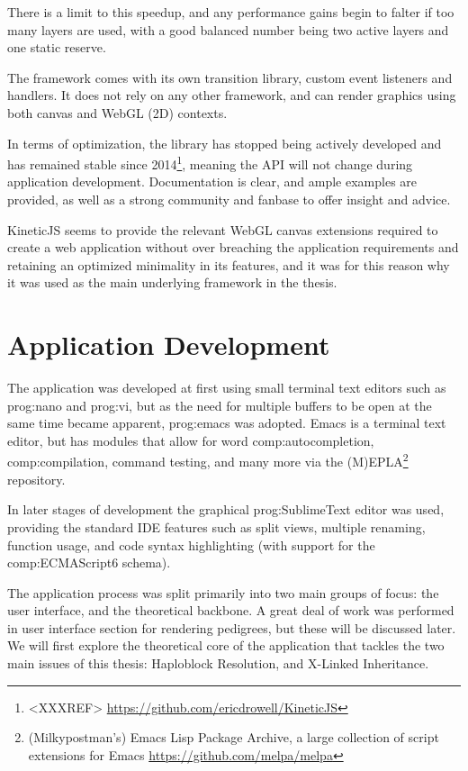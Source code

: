 There is a limit to this speedup, and any performance gains begin to falter if too many layers are used, with a good balanced number being two active layers and one static reserve.

The framework comes with its own transition library, custom event listeners and handlers. It does not rely on any other framework, and can render graphics using both canvas and WebGL (2D) contexts.

In terms of optimization, the library has stopped being actively developed and has remained stable since 2014\footnote{<XXXREF> \url{https://github.com/ericdrowell/KineticJS}}, meaning the API will not change during application development. Documentation is clear, and ample examples are provided, as well as a strong community and fanbase to offer insight and advice.

KineticJS seems to provide the relevant WebGL canvas extensions required to create a web application without over breaching the application requirements and retaining an optimized minimality in its features, and it was for this reason why it was used as the main underlying framework in the thesis.

\section{Application Development}

The application was developed at first using small terminal text editors such as \gls{prog:nano} and \gls{prog:vi}, but as the need for multiple buffers to be open at the same time became apparent, \gls{prog:emacs} was adopted. Emacs is a terminal text editor, but has modules that allow for word \gls{comp:autocompletion}, \gls{comp:compilation}, command testing, and many more via the (M)EPLA\footnote{(Milkypostman's) Emacs Lisp Package Archive, a large collection of script extensions for Emacs \url{https://github.com/melpa/melpa}} repository\citep{stallman1981emacs}.

In later stages of development the graphical \gls{prog:SublimeText} editor was used, providing the standard IDE features such as split views, multiple renaming, function usage, and code syntax highlighting (with support for the \gls{comp:ECMAScript6} schema).

The application process was split primarily into two main groups of focus: the user interface, and the theoretical backbone. A great deal of work was performed in user interface section for rendering pedigrees, but these will be discussed later. We will first explore the theoretical core of the application that tackles the two main issues of this thesis: Haploblock Resolution, and X-Linked Inheritance. 


